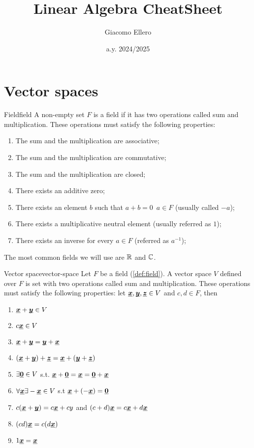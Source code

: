 \documentclass[12pt]{extarticle}
\title{Linear Algebra CheatSheet}
\author{Giacomo Ellero}
\date{a.y. 2024/2025}
\renewcommand{\vec}[1]{\uvec{#1}}
\begin{document}
\firstpage

\section{Vector spaces}

\begin{definition}{Field}{field}
    A non-empty set $F$ is a field if it has two operations called sum and multiplication.
    These operations must satisfy the following properties:
    \begin{enumerate}
        \item The sum and the multiplication are associative;
        \item The sum and the multiplication are commutative;
        \item The sum and the multiplication are closed;
        \item There exists an additive zero;
        \item There exists an element $b$ such that $a+b = 0 \enspace a \in F$ (usually called $-a$);
        \item There exists a multiplicative neutral element (usually referred as $1$);
        \item There exists an inverse for every $a \in F$ (referred as $a^{-1}$);
    \end{enumerate}
\end{definition}

The most common fields we will use are $\mathbb{R}$ and $\mathbb{C}$.

\begin{definition}{Vector space}{vector-space}
    Let $F$ be a field (\cref{def:field}). A vector space $V$ defined over $F$ is set with two operations called sum and multiplication.
    These operations must satisfy the following properties: let $\vec{x} , \vec{y}, \vec{z} \in V$ and $c, d \in F$, then
    \begin{enumerate}
        \item $ \vec{x} +\vec{y} \in V$
        \item $c \vec{x}  \in V$
        \item $ \vec{x}  + \vec{y} = \vec{y}+  \vec{x} $
        \item $ (\vec x + \vec y) + \vec z = \vec x + (\vec y + \vec z)$
        \item $\exists \vec 0 \in V$ s.t. $ \vec{x} +\vec 0 =  \vec{x}  = \vec 0 +  \vec{x} $
        \item $\forall \vec x \exists -\vec x \in V$ s.t $\vec x + (-\vec x) = \vec 0 $
        \item $c( \vec{x} +\vec{y}) = c \vec{x}  + cy$ and $(c+d) \vec{x}  = c \vec{x}  + d \vec{x} $
        \item $(cd) \vec{x}  = c(d \vec{x} )$
        \item $1\vec x = \vec x$
    \end{enumerate}
\end{definition}
\end{document}
